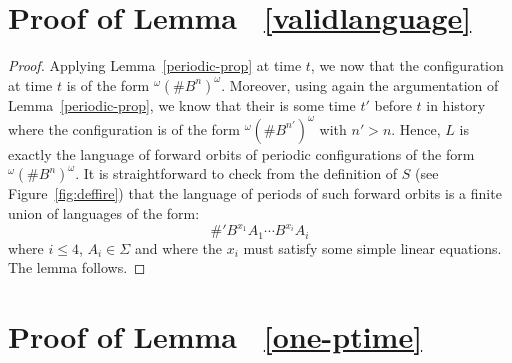 \documentclass{jac}
\theoremstyle{definition}
\begin{document}
\section{Proof of Lemma  ~\ref{validlanguage}}

  \begin{proof}
    Applying Lemma~\ref{periodic-prop} at time $t$, we now that the
    configuration at time $t$ is of the form
    $^\omega(\#B^n)^\omega$. Moreover, using again the argumentation
    of Lemma~\ref{periodic-prop}, we know that their is some time $t'$
    before $t$ in history where the configuration is of the form
    $^\omega(\#B^{n'})^\omega$ with $n'>n$. Hence, $L$ is exactly the
    language of forward orbits of periodic configurations of the form
    $^\omega(\#B^n)^\omega$. It is straightforward to check from the
    definition of $S$ (see Figure~\ref{fig:deffire}) that the language
    of periods of such forward orbits is a finite union of languages
    of the form:
    \[\#'B^{x_1}A_1\cdots B^{x_i}A_i\] where $i\leq 4$, $A_i\in\Sigma$ and where the
  $x_i$ must satisfy some simple linear equations. The lemma follows.
  \end{proof}

\section{Proof of Lemma  ~\ref{one-ptime}}
\end{document}
